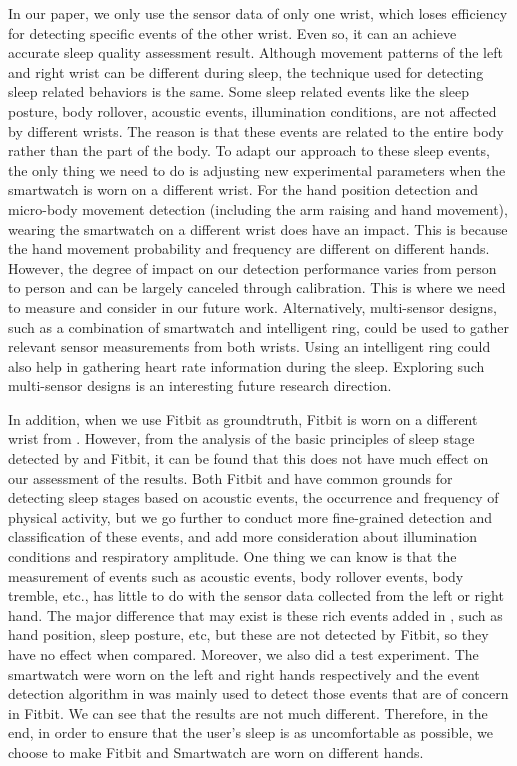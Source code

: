  In our paper, we only use the sensor data of only one wrist, which loses efficiency for detecting specific events of the other wrist. Even so, it can an achieve accurate sleep quality assessment result. Although movement patterns of the left and right wrist can be different during sleep, the technique used for detecting sleep related behaviors is the same. Some sleep related events like the sleep posture, body rollover, acoustic events, illumination conditions, are not affected by different wrists. The reason is that these events are related to the entire body rather than the part of the body. To adapt our approach to these sleep events, the only thing we need to do is adjusting new experimental parameters when the smartwatch is worn on a different wrist. For the hand position detection and micro-body movement detection (including the arm 	raising and hand movement), wearing the smartwatch on a different wrist does have an impact. This is because the hand movement probability and frequency are different on different hands. However, the degree of impact on our detection performance varies from person to person and can be largely canceled through calibration. This is where we need to measure and consider in our future work. Alternatively, multi-sensor designs, such as a combination of smartwatch and intelligent ring, could be used to gather relevant sensor measurements from both wrists. Using an intelligent ring could also help in gathering heart rate information during the sleep. Exploring such multi-sensor designs is an interesting future research direction.

 In addition, when we use Fitbit as groundtruth, Fitbit is worn on a different wrist from {\systemname}. However, from the analysis of the basic principles of sleep stage detected by {\systemname} and Fitbit, it can be found that this does not have much effect on our assessment of the results. Both Fitbit and {\systemname} have common grounds for detecting sleep stages based on acoustic events, the occurrence and frequency of physical activity, but we go further to conduct more fine-grained detection and classification of these events, and add more consideration about illumination conditions and respiratory amplitude. One thing we can know is that the measurement of events such as acoustic events, body rollover events, body tremble, etc., has little to do with the sensor data collected from the left or right hand. The major difference that may exist is these rich events added in {\systemname}, such as hand position, sleep posture, etc,  but these are not detected by Fitbit, so they have no effect when compared. Moreover, we also did a test experiment. The smartwatch were worn on the left and right hands respectively and the event detection algorithm in {\systemname} was mainly used to detect those events that are of concern in Fitbit. We can see that the results are not much different. Therefore, in the end, in order to ensure that the user's sleep is as uncomfortable as possible, we choose to make Fitbit and Smartwatch are worn on different hands.


